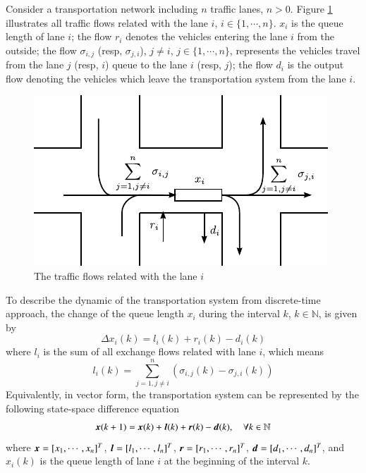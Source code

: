 \documentclass[preprint,authoryear,12pt]{elsarticle}
\renewcommand{\vec}[1]{\mbox{\boldmath$#1$}}
\begin{document}
Consider a transportation network including $n$ traffic lanes, $n>0$. Figure \ref{fig:flows} illustrates all traffic flows related with the lane $i$, $i\in\{1,\cdots,n\}$. $x_i$ is the queue length of lane $i$; the flow $r_i$ denotes the vehicles entering the lane $i$ from the outside; the flow $\sigma_{i,j}$ (resp, $\sigma_{j,i}$), $j\neq i$, $j\in\{1,\cdots,n\}$, represents the vehicles travel from the lane $j$ (resp, $i$) queue to the lane $i$ (resp, $j$); the flow $d_{i}$ is the output flow denoting the vehicles which leave the transportation system from the lane $i$.

\begin{figure}[ht]
  \centering
  \includegraphics{pics/flows}
  \caption{The traffic flows related with the lane $i$}
  \label{fig:flows}
\end{figure}

To describe the dynamic of the transportation system from discrete-time approach, the change of the queue length $x_i$ during the interval $k$, $k\in\mathbb{N}$, is given by
\begin{equation}\label{equ:mdl_gnl_lane}
\Delta x_i(k) = l_i(k)+r_i(k)-d_i(k)
\end{equation}
where $l_i$ is the sum of all exchange flows related with lane $i$, which means
\begin{equation}\label{equ:exchange_vehicle}
 l_i(k)=\sum_{j=1,j\neq i}^{n}(\sigma_{i,j}(k)-\sigma_{j,i}(k))
\end{equation}
Equivalently, in vector form, the transportation system can be represented by the following state-space difference equation
\begin{equation}\label{equ:mdl_gnl}
\vec{x}(k+1)=\vec{x}(k)+\vec{l}(k)+\vec{r}(k)-\vec{d}(k),\quad \forall k\in\mathbb{N}
\end{equation}
where $\vec{x}=[x_1,\cdots,x_n]^T$, $\vec{l}=[l_1,\cdots,l_n]^T$, $\vec{r}=[r_1,\cdots,r_n]^T$, $\vec{d}=[d_1,\cdots,d_n]^T$, and $x_i(k)$ is the queue length of lane $i$ at the beginning of the interval $k$.
\end{document}
